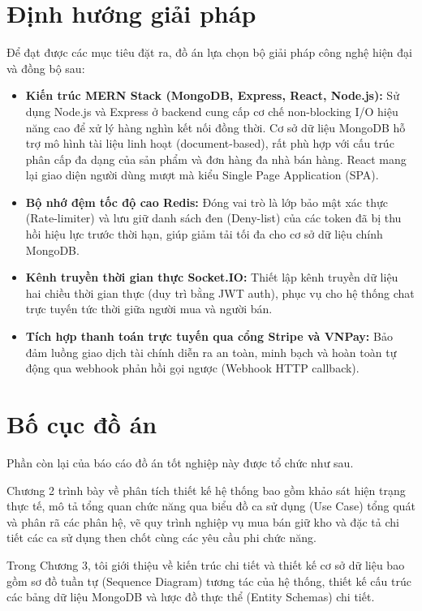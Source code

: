 \documentclass[../DoAn.tex]{subfiles}
\begin{document}
\section{Định hướng giải pháp}
\label{section:1.3}
Để đạt được các mục tiêu đặt ra, đồ án lựa chọn bộ giải pháp công nghệ hiện đại và đồng bộ sau:
\begin{itemize}
\item \textbf{Kiến trúc MERN Stack (MongoDB, Express, React, Node.js):} Sử dụng Node.js và Express ở backend cung cấp cơ chế non-blocking I/O hiệu năng cao để xử lý hàng nghìn kết nối đồng thời. Cơ sở dữ liệu MongoDB hỗ trợ mô hình tài liệu linh hoạt (document-based), rất phù hợp với cấu trúc phân cấp đa dạng của sản phẩm và đơn hàng đa nhà bán hàng. React mang lại giao diện người dùng mượt mà kiểu Single Page Application (SPA).
\item \textbf{Bộ nhớ đệm tốc độ cao Redis:} Đóng vai trò là lớp bảo mật xác thực (Rate-limiter) và lưu giữ danh sách đen (Deny-list) của các token đã bị thu hồi hiệu lực trước thời hạn, giúp giảm tải tối đa cho cơ sở dữ liệu chính MongoDB.
\item \textbf{Kênh truyền thời gian thực Socket.IO:} Thiết lập kênh truyền dữ liệu hai chiều thời gian thực (duy trì bằng JWT auth), phục vụ cho hệ thống chat trực tuyến tức thời giữa người mua và người bán.
\item \textbf{Tích hợp thanh toán trực tuyến qua cổng Stripe và VNPay:} Bảo đảm luồng giao dịch tài chính diễn ra an toàn, minh bạch và hoàn toàn tự động qua webhook phản hồi gọi ngược (Webhook HTTP callback).
\end{itemize}

\section{Bố cục đồ án}
\label{section:1.4}
Phần còn lại của báo cáo đồ án tốt nghiệp này được tổ chức như sau.

Chương 2 trình bày về phân tích thiết kế hệ thống bao gồm khảo sát hiện trạng thực tế, mô tả tổng quan chức năng qua biểu đồ ca sử dụng (Use Case) tổng quát và phân rã các phân hệ, vẽ quy trình nghiệp vụ mua bán giữ kho và đặc tả chi tiết các ca sử dụng then chốt cùng các yêu cầu phi chức năng.

Trong Chương 3, tôi giới thiệu về kiến trúc chi tiết và thiết kế cơ sở dữ liệu bao gồm sơ đồ tuần tự (Sequence Diagram) tương tác của hệ thống, thiết kế cấu trúc các bảng dữ liệu MongoDB và lược đồ thực thể (Entity Schemas) chi tiết.
\end{document}
